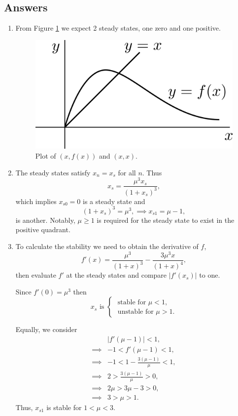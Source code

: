 \documentclass[10pt]{article}
\newcommand{\bb}{\begin{equation}}
\newcommand{\ee}{\end{equation}}
\newcommand{\fig}[1]{Figure \ref{#1}}
\newcommand{\ttp}{.45\textwidth}
\renewcommand{\l}{\left(}
\renewcommand{\r}{\right)}
\begin{document}
\begin{Answ}
\subsection{Answers}
\begin{enumerate}
\item From \fig{Discrete_schematic} we expect 2 steady states, one zero and one positive.
\begin{figure}[h!!!tb]
\centering
\includegraphics[width=\ttp]{../../Pictures/Discrete_schematic.png}
\caption{\label{Discrete_schematic} Plot of $(x,f(x))$ and $(x,x)$.}
\end{figure}

\item The steady states satisfy $x_n=x_s$ for all $n$. Thus
\bb
x_s=\frac{\mu^3 x_s}{(1+x_s)^3},
\ee
which implies $x_{s0}=0$ is a steady state and
\bb
(1+x_s)^3=\mu^3, \implies x_{s1}=\mu-1,
\ee
is another. Notably, $\mu\geq 1$ is required for the steady state to exist in the positive quadrant.

\item To calculate the stability we need to obtain the derivative of $f$,
\bb
f'(x)=\frac{\mu^3}{ \l 1+x \r^3}-\frac{3\mu^3 x}{ \l 1+x \r^4},
\ee
then evaluate $f'$ at the steady states and compare $|f'(x_s)|$ to one.

Since $f'(0)=\mu^3$ then
\bb
x_s\textrm{ is }\left\{\begin{array}{l}
\textrm{ stable for } \mu<1,\\
\textrm{ unstable for } \mu>1.
\end{array}\right.
\ee

Equally, we consider
\begin{align}
&|f'(\mu-1)|<1,\nonumber\\
\implies &-1<f'(\mu-1)<1,\nonumber\\
\implies & -1<1-\frac{3(\mu-1)}{\mu}<1,\nonumber\\
\implies & 2>\frac{3(\mu-1)}{\mu}>0,\nonumber\\
\implies & 2\mu>3\mu-3>0,\nonumber\\
\implies & 3>\mu>1.\nonumber
\end{align}
Thus, $x_{s1}$ is stable for $1<\mu<3$.



\end{enumerate}
\end{Answ}
\end{document}
